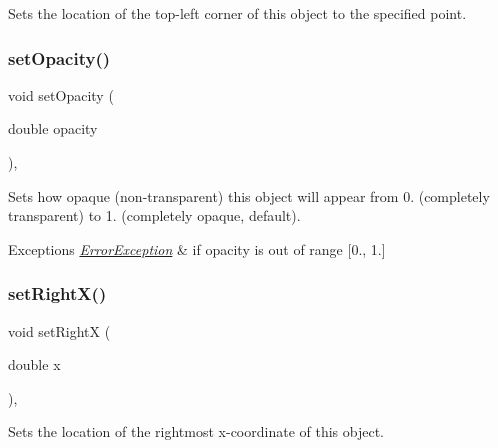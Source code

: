 Sets the location of the top-\/left corner of this object to the specified point. 

\mbox{\label{classGObject_a04af1866cc1bae4a1226695794a50539}} 
\subsubsection{\texorpdfstring{set\+Opacity()}{setOpacity()}}
{\footnotesize\ttfamily void set\+Opacity (\begin{DoxyParamCaption}\item[{double}]{opacity }\end{DoxyParamCaption})\hspace{0.3cm}{\ttfamily [virtual]}, {\ttfamily [inherited]}}



Sets how opaque (non-\/transparent) this object will appear from 0. (completely transparent) to 1. (completely opaque, default). 


\begin{DoxyExceptions}{Exceptions}
{\em \mbox{\hyperlink{classErrorException}{Error\+Exception}}} & if opacity is out of range \mbox{[}0., 1.\mbox{]} \\
\hline
\end{DoxyExceptions}
\mbox{\label{classGObject_a3c90b758cdc2c911c9ef76c4360eb912}} 
\subsubsection{\texorpdfstring{set\+Right\+X()}{setRightX()}}
{\footnotesize\ttfamily void set\+RightX (\begin{DoxyParamCaption}\item[{double}]{x }\end{DoxyParamCaption})\hspace{0.3cm}{\ttfamily [virtual]}, {\ttfamily [inherited]}}



Sets the location of the rightmost x-\/coordinate of this object. 

\mbox{\label{classGObject_aca25d49481f9bf5fc8f7df4c086c4ce7}} 
